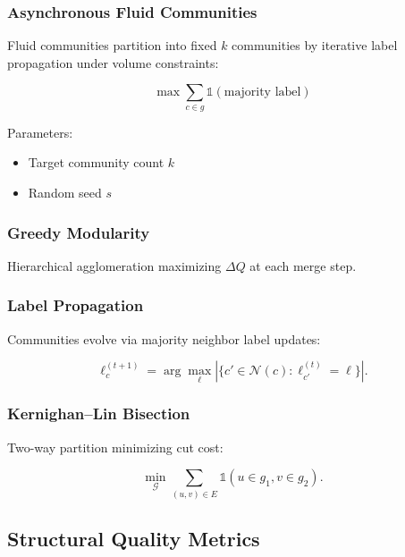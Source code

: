 \documentclass[conference]{IEEEtran}
\begin{document}
\subsubsection{Asynchronous Fluid Communities}

Fluid communities partition into fixed $k$ communities by iterative label propagation under volume constraints:

\begin{equation}
\max \sum_{c \in g} \mathbb{1}(\text{majority label})
\label{eq:fluid}
\end{equation}

Parameters:
\begin{itemize}
\item Target community count $k$
\item Random seed $s$
\end{itemize}

\subsubsection{Greedy Modularity}

Hierarchical agglomeration maximizing $\Delta Q$ at each merge step.

\subsubsection{Label Propagation}

Communities evolve via majority neighbor label updates:

\begin{equation}
\ell_c^{(t+1)} = 
\arg\max_\ell |\{ c' \in \mathcal{N}(c): \ell_{c'}^{(t)} = \ell \}|.
\end{equation}

\subsubsection{Kernighan--Lin Bisection}

Two-way partition minimizing cut cost:

\begin{equation}
\min_{\mathcal{G}} \sum_{(u,v) \in E} \mathbb{1}(u \in g_1, v \in g_2).
\end{equation}

\subsection{Structural Quality Metrics}
\label{subsec:struct_metrics}
\end{document}

